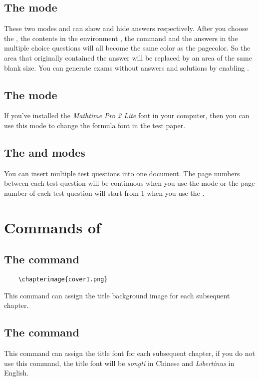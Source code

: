 \subsection{The  mode}
These two modes  and  can show and hide answers respectively. After you choose the , the contents in the environment , the command  and the answers in the multiple choice questions will all become the same color as the pagecolor. So the area that originally contained the answer will be replaced by an area of the same blank size. You can generate exams without answers and solutions by enabling .

\subsection{The  mode}
If you've installed the \emph{Mathtime Pro 2 Lite} font in your computer, then you can use this mode to change the formula font in the test paper.
\subsection{The  and  modes}
You can insert multiple test questions into one document. The page numbers between each test question will be continuous when you use the  mode or the page number of each test question will start from 1 when you use the .


\section{Commands of }
\subsection{The  command}
\begin{verbatim}
    \chapterimage{cover1.png}
\end{verbatim}
This command can assign the title background image for each subsequent chapter.

\subsection{The  command}
This command can assign the title font for each subsequent chapter, if you do not use this command, the title font will be \emph{songti} in Chinese and \emph{Libertinus} in English.


